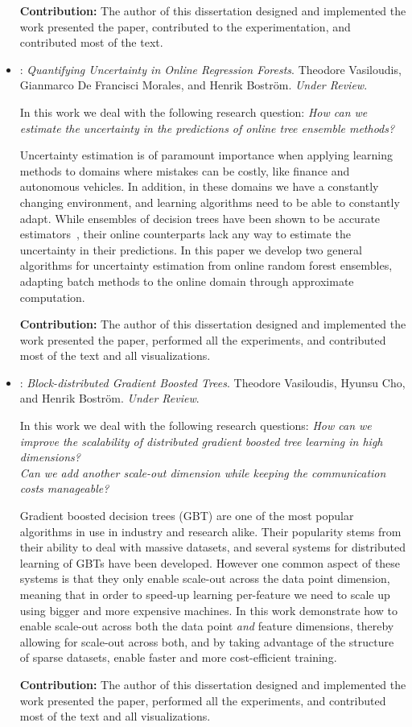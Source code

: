 \begin{itemize}
	\textbf{Contribution:} The author of this dissertation designed and implemented the
	work presented the paper, contributed to the experimentation, and contributed most of the text.

	\item \textbf{\uncertaintrees}: \emph{Quantifying Uncertainty in Online Regression Forests}. Theodore Vasiloudis, Gianmarco De Francisci Morales, and Henrik Bostr\"{o}m. \emph{Under Review}.

	In this work we deal with the following research question:
	\emph{How can we estimate the uncertainty in the predictions of online tree
	ensemble methods?}

	Uncertainty estimation is of paramount importance when applying learning methods
	to domains where mistakes can be costly, like finance and autonomous vehicles.
	In addition, in these domains we have a constantly changing environment,
	and learning algorithms need to be able to constantly adapt. While ensembles
	of decision trees have been shown to be accurate estimators~\cite{hundreds-classifiers}, their online
	counterparts lack any way to estimate the uncertainty in their predictions.
	In this paper we develop two general algorithms for uncertainty estimation
	from online random forest ensembles, adapting batch methods to the online
	domain through approximate computation.

	\textbf{Contribution:} The author of this dissertation designed and implemented the
	work presented the paper, performed all the experiments, and contributed most of the text and all visualizations.


	\item \textbf{\blockgbt}: \emph{Block-distributed Gradient Boosted Trees}. Theodore Vasiloudis, Hyunsu Cho, and Henrik Bostr\"{o}m. \emph{Under Review}.


	In this work we deal with the following research questions:
	\emph{How can we improve the scalability of distributed gradient boosted tree learning
	in high dimensions?\\
	Can we add another scale-out dimension while keeping the
	communication costs manageable?}

	Gradient boosted decision trees (GBT) are one of the most popular algorithms in
	use in industry and research alike. Their popularity stems from their ability
	to deal with massive datasets, and several systems for distributed learning
	of GBTs have been developed. However one common aspect of these systems is that
	they only enable scale-out across the data point dimension, meaning that in
	order to speed-up learning per-feature we need to scale up using bigger and more
	expensive machines. In this work demonstrate how to enable scale-out across
	both the data point \emph{and} feature dimensions, thereby allowing for scale-out
	across both, and by taking advantage of the structure of sparse datasets,
	enable faster and more cost-efficient training.

	\textbf{Contribution:} The author of this dissertation designed and implemented the
	work presented the paper, performed all the experiments, and contributed most of the text and all visualizations.
\end{itemize}

